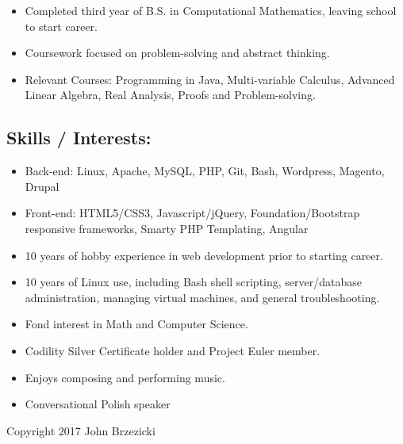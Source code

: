 \begin{itemize}
\tightlist
\item
  Completed third year of B.S. in Computational Mathematics, leaving
  school to start career.
\item
  Coursework focused on problem-solving and abstract thinking.
\item
  Relevant Courses: Programming in Java, Multi-variable Calculus,
  Advanced Linear Algebra, Real Analysis, Proofs and Problem-solving.
\end{itemize}

\hypertarget{skills-interests}{%
\subsection{Skills / Interests:}\label{skills-interests}}

\begin{itemize}
\tightlist
\item
  Back-end: Linux, Apache, MySQL, PHP, Git, Bash, Wordpress, Magento,
  Drupal
\item
  Front-end: HTML5/CSS3, Javascript/jQuery, Foundation/Bootstrap
  responsive frameworks, Smarty PHP Templating, Angular
\item
  10 years of hobby experience in web development prior to starting
  career.
\item
  10 years of Linux use, including Bash shell scripting, server/database
  administration, managing virtual machines, and general
  troubleshooting.
\item
  Fond interest in Math and Computer Science.
\item
  Codility Silver Certificate holder and Project Euler member.
\item
  Enjoys composing and performing music.
\item
  Conversational Polish speaker
\end{itemize}

Copyright 2017 John Brzezicki
